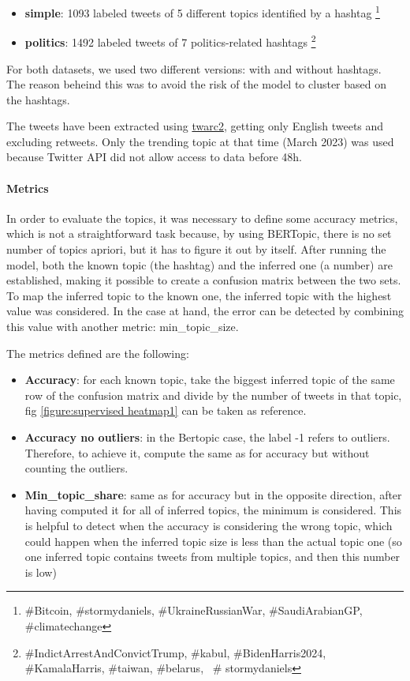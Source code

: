 \begin{itemize}
    \item \textbf{simple}: 1093 labeled tweets of 5 different topics identified by a hashtag \footnote{\#Bitcoin, \#stormydaniels, \#UkraineRussianWar, \#SaudiArabianGP, \#climatechange}
    \item \textbf{politics}: 1492 labeled tweets of 7 politics-related hashtags \footnote{\#IndictArrestAndConvictTrump, \#kabul, \#BidenHarris2024, \#KamalaHarris, \#taiwan, \#belarus,  \# stormydaniels}
\end{itemize}


For both datasets, we used two different versions: with and without hashtags. The reason beheind this was to avoid the risk of the model to cluster based on the hashtags.

The tweets have been extracted using \href{https://twarc-project.readthedocs.io/en/latest/twarc2_en_us/}{twarc2}, getting only English tweets and excluding retweets. Only the trending topic at that time (March 2023) was used because Twitter API did not allow access to data before 48h.

\paragraph{Metrics}
In order to evaluate the topics, it was necessary to define some accuracy metrics, which is not a straightforward task because, by using BERTopic, there is no set number of topics apriori, but it has to figure it out by itself.
After running the model, both the known topic (the hashtag) and the inferred one (a number) are established, making it possible to create a confusion matrix between the two sets. To map the inferred topic to the known one, the inferred topic with the highest value was considered. In the case at hand, the error can be detected  by combining this value with another metric: min\_topic\_size.

The metrics defined are the following:

\begin{itemize}
    \item \textbf{Accuracy}: for each known topic, take the biggest inferred topic of the same row of the confusion matrix and divide by the number of tweets in that topic, fig \ref{figure:supervised heatmap1} can be taken as reference.
    \item \textbf{Accuracy no outliers}: in the Bertopic case, the label -1 refers to outliers. Therefore, to achieve it, compute the same as for accuracy but without counting the outliers.
    \item \textbf{Min\_topic\_share}: same as for accuracy but in the opposite direction, after having computed it for all of inferred topics, the minimum is considered. This is helpful to detect when the accuracy is considering the wrong topic, which could happen when the inferred topic size is less than the actual topic one (so one inferred topic contains tweets from multiple topics, and then this number is low)
\end{itemize}


